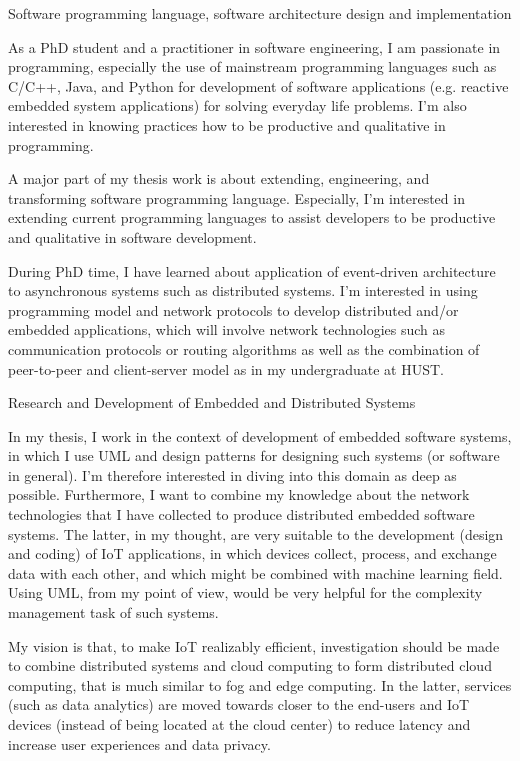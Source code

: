 \begin{cventries}

\cvinterest
{Software programming language, software architecture design and implementation}
{
	\begin{cvitems}
		\item{As a PhD student and a practitioner in software engineering, I am passionate in programming, especially the use of mainstream programming languages such as C/C++, Java, and Python for development of software applications (e.g. reactive embedded system applications) for solving everyday life problems. I'm also interested in knowing practices how to be productive and qualitative in programming.}
		\item{A major part of my thesis work is about extending, engineering, and transforming software programming language. Especially, I'm interested in extending current programming languages to assist developers to be productive and qualitative in software development.}
		\item{During PhD time, I have learned about application of event-driven architecture to asynchronous systems such as distributed systems. I'm interested in using programming model and network protocols to develop distributed and/or embedded applications, which will involve network technologies such as communication protocols or routing algorithms as well as the combination of peer-to-peer and client-server model as in my undergraduate at HUST.}
	\end{cvitems}
}


\cvinterest
{Research and Development of Embedded and Distributed Systems}
{\begin{cvitems}
		\item{In my thesis, I work in the context of development of embedded software systems, in which I use UML and design patterns for designing such systems (or software in general). I'm therefore interested in diving into this domain as deep as possible. Furthermore, I want to combine my knowledge about the network technologies that I have collected to produce distributed embedded software systems. The latter, in my thought, are very suitable to the development (design and coding) of IoT applications, in which devices collect, process, and exchange data with each other, and which might be combined with machine learning field. Using UML, from my point of view, would be very helpful for the complexity management task of such systems.} 
		\item{My vision is that, to make IoT realizably efficient, investigation should be made to combine distributed systems and cloud computing to form distributed cloud computing, that is much similar to fog and edge computing. In the latter, services (such as data analytics) are moved towards closer to the end-users and IoT devices (instead of being located at the cloud center) to reduce latency and increase user experiences and data privacy.}
\end{cvitems}}


\end{cventries}
